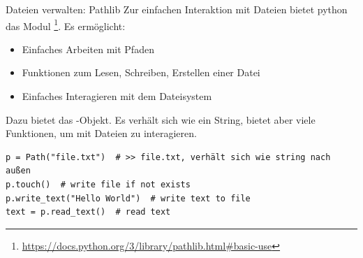 \documentclass[12pt, aspectratio=169, usepdftitle=false]{beamer}
\newcommand{\furl}[1]{\footnote{\url{#1}}}
\begin{document}
\begin{frame}[fragile]{Dateien verwalten: Pathlib}
  Zur einfachen Interaktion mit Dateien bietet python das Modul \furl{https://docs.python.org/3/library/pathlib.html\#basic-use}.\newline
  Es ermöglicht:\pause
  \begin{itemize}
     \item Einfaches Arbeiten mit Pfaden\pause
	  \item Funktionen zum Lesen, Schreiben, Erstellen einer Datei\pause
	  \item Einfaches Interagieren mit dem Dateisystem\pause
  \end{itemize}

  Dazu bietet  das -Objekt. \pause
  \medskip
  Es verhält sich wie ein String, bietet aber viele Funktionen, um mit Dateien zu interagieren.\pause
	
	
	\medskip
	
	\begin{lstlisting}[language=pytiny]
p = Path("file.txt")  # >> file.txt, verhält sich wie string nach außen
p.touch()  # write file if not exists                                   
p.write_text("Hello World")  # write text to file                               
text = p.read_text()  # read text
	\end{lstlisting}
\end{frame}
\end{document}
